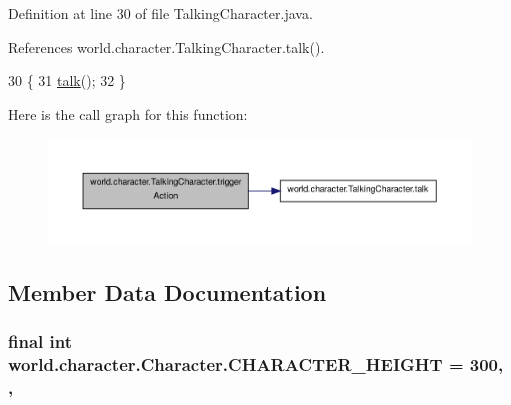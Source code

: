 Definition at line 30 of file Talking\-Character.\-java.



References world.\-character.\-Talking\-Character.\-talk().


\begin{DoxyCode}
30                                 \{
31         \hyperlink{classworld_1_1character_1_1_talking_character_ac38a9c3d5a62edc8e8ae776410c834af}{talk}();
32     \}
\end{DoxyCode}


Here is the call graph for this function\-:
\nopagebreak
\begin{figure}[H]
\begin{center}
\leavevmode
\includegraphics[width=350pt]{classworld_1_1character_1_1_talking_character_a880e0de97bfae094b3d25a12c055cad2_cgraph}
\end{center}
\end{figure}




\subsection{Member Data Documentation}
\hypertarget{classworld_1_1character_1_1_character_a31596c03022d61aeb8aac56f149309be}{
\subsubsection[{C\-H\-A\-R\-A\-C\-T\-E\-R\-\_\-\-H\-E\-I\-G\-H\-T}]{\setlength{\rightskip}{0pt plus 5cm}final int world.\-character.\-Character.\-C\-H\-A\-R\-A\-C\-T\-E\-R\-\_\-\-H\-E\-I\-G\-H\-T = 300\hspace{0.3cm}{\ttfamily [static]}, {\ttfamily [protected]}, {\ttfamily [inherited]}}}\label{classworld_1_1character_1_1_character_a31596c03022d61aeb8aac56f149309be}


